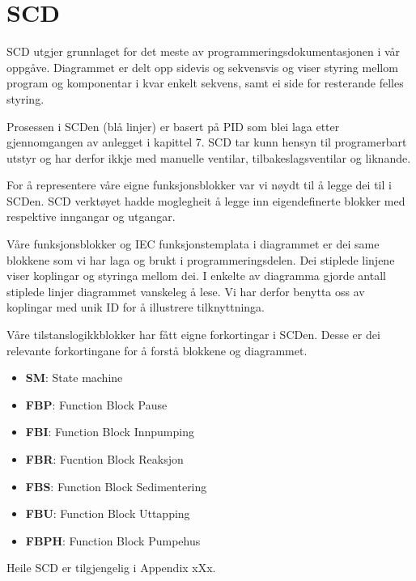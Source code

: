 \newpage
\section{SCD}
\thispagestyle{fancy}


\gls{SCD} utgjer grunnlaget for det meste av programmeringsdokumentasjonen i vår oppgåve.
Diagrammet er delt opp sidevis og sekvensvis og viser styring mellom program og komponentar i kvar enkelt sekvens,
samt ei side for resterande felles styring.

Prosessen i \gls{SCD}en (blå linjer) er basert på \gls{PID} som blei laga etter gjennomgangen av anlegget i kapittel 7.
\gls{SCD} tar kunn hensyn til programerbart utstyr og har derfor ikkje med manuelle ventilar, tilbakeslagsventilar og liknande.

For å representere våre eigne funksjonsblokker var vi nøydt til å legge dei til i \gls{SCD}en.
\gls{SCD} verktøyet hadde moglegheit å legge inn eigendefinerte blokker med respektive inngangar og utgangar.

Våre funksjonsblokker og IEC funksjonstemplata i diagrammet er dei same blokkene som vi har laga og brukt i programmeringsdelen. 
Dei stiplede linjene viser koplingar og styringa mellom dei. \newline
I enkelte av diagramma gjorde antall stiplede linjer diagrammet vanskeleg å lese. Vi har derfor benytta oss av koplingar med
unik ID for å illustrere tilknyttninga.

Våre tilstanslogikkblokker har fått eigne forkortingar i \gls{SCD}en. Desse er dei relevante forkortingane 
for å forstå blokkene og diagrammet.

\begin{itemize}
    \item \textbf{SM}:   State machine
    \item \textbf{FBP}:  Function Block Pause
    \item \textbf{FBI}:  Function Block Innpumping
    \item \textbf{FBR}:  Fucntion Block Reaksjon
    \item \textbf{FBS}:  Function Block Sedimentering
    \item \textbf{FBU}:  Function Block Uttapping
    \item \textbf{FBPH}: Function Block Pumpehus
\end{itemize}

Heile \gls{SCD} er tilgjengelig i Appendix xXx. \newline
\newpage

